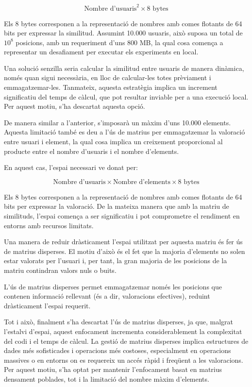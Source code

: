 \documentclass[a4paper,12pt]{report}
\begin{document}
\[
\text{Nombre d’usuaris}^2 \times 8 \text{ bytes}
\]

Els 8 bytes corresponen a la representació de nombres amb comes flotants de 64 bits per expressar la similitud.
Assumint 10.000 usuaris, això suposa un total de $10^8$ posicions, amb un requeriment d’uns 800 MB, la qual cosa comença a representar un desafiament per executar els experiments en local.

Una solució senzilla seria calcular la similitud entre usuaris de manera dinàmica, només quan sigui necessària, en lloc de calcular-les totes prèviament i emmagatzemar-les.
Tanmateix, aquesta estratègia implica un increment significatiu del temps de càlcul, que pot resultar inviable per a una execució local.
Per aquest motiu, s’ha descartat aquesta opció.

De manera similar a l’anterior, s’imposarà un màxim d’uns 10.000 elements.
Aquesta limitació també es deu a l’ús de matrius per emmagatzemar la valoració entre usuari i element, la qual cosa implica un creixement proporcional al producte entre el nombre d’usuaris i el nombre d’elements.

En aquest cas, l’espai necessari ve donat per:

\[
\text{Nombre d’usuaris} \times \text{Nombre d’elements} \times 8 \text{ bytes}
\]

Els 8 bytes corresponen a la representació de nombres amb comes flotants de 64 bits per expressar la valoració.
De la mateixa manera que amb la matriu de similituds, l’espai comença a ser significatiu i pot comprometre el rendiment en entorns amb recursos limitats.

Una manera de reduir dràsticament l'espai utilitzat per aquesta matriu és fer ús de matrius disperses.
El motiu d’això és el fet que la majoria d’elements no solen estar valorats per l’usuari i, per tant, la gran majoria de les posicions de la matriu contindran valors nuls o buits.

L’ús de matrius disperses permet emmagatzemar només les posicions que contenen informació rellevant (és a dir, valoracions efectives), reduint dràsticament l’espai requerit.

Tot i això, finalment s’ha descartat l’ús de matrius disperses, ja que, malgrat l’estalvi d’espai, aquest enfocament incrementa considerablement la complexitat del codi i el temps de càlcul.
La gestió de matrius disperses implica estructures de dades més sofisticades i operacions més costoses, especialment en operacions massives o en entorns on es requereix un accés ràpid i freqüent a les valoracions.
Per aquest motiu, s’ha optat per mantenir l’enfocament basat en matrius densament poblades, tot i la limitació del nombre màxim d’elements.
\end{document}
